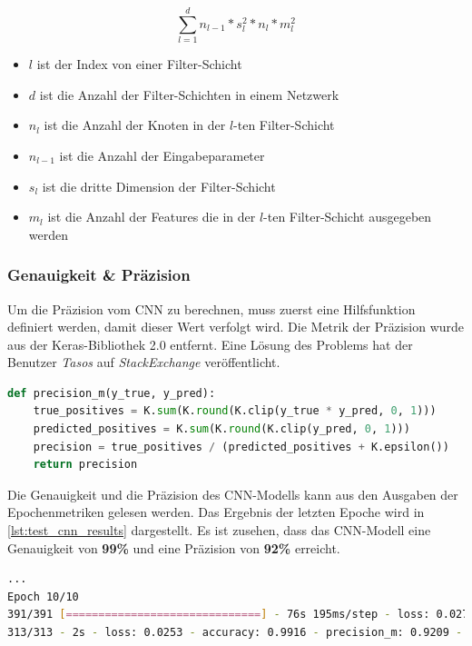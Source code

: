 \[\sum^{d}_{l=1}n_{l-1} * s^2_l * n_l * m^2_l \]

\begin{itemize}
	\item $l$ ist der Index von einer Filter-Schicht
	\item $d$ ist die Anzahl der Filter-Schichten in einem Netzwerk
	\item $n_l$ ist die Anzahl der Knoten in der $l$-ten Filter-Schicht
	\item $n_{l-1}$ ist die Anzahl der Eingabeparameter
	\item $s_l$ ist die dritte Dimension der Filter-Schicht
	\item $m_l$ ist die Anzahl der Features die in der $l$-ten Filter-Schicht ausgegeben werden
\end{itemize}
\cite{Kaiming_2014}

\subsubsection{Genauigkeit \& Präzision}

Um die Präzision vom CNN zu berechnen, muss zuerst eine Hilfsfunktion definiert werden, damit dieser Wert verfolgt wird. Die Metrik der Präzision wurde aus der Keras-Bibliothek 2.0 entfernt. Eine Lösung des Problems hat der Benutzer \textit{Tasos} auf \textit{StackExchange} veröffentlicht. \cite{stackexchange_2020}

\begin{minipage}{\textwidth}
	\begin{lstlisting}[language=Python, caption=Hilfsfunktion für Präzision \cite{stackexchange_2020}, label=lst:func_precision]
def precision_m(y_true, y_pred):
	true_positives = K.sum(K.round(K.clip(y_true * y_pred, 0, 1)))
	predicted_positives = K.sum(K.round(K.clip(y_pred, 0, 1)))
	precision = true_positives / (predicted_positives + K.epsilon())
	return precision	
	\end{lstlisting}
\end{minipage}


Die Genauigkeit und die Präzision des CNN-Modells kann aus den Ausgaben der Epochenmetriken gelesen werden. Das Ergebnis der letzten Epoche wird in \ref{lst:test_cnn_results} dargestellt. Es ist zusehen, dass das CNN-Modell eine Genauigkeit von \textbf{99\%} und eine Präzision von \textbf{92\%} erreicht. 

\begin{minipage}{\textwidth}
	\begin{lstlisting}[language=Bash, caption=Testergebnisse vom CNN, label=lst:test_cnn_results]
...
Epoch 10/10
391/391 [==============================] - 76s 195ms/step - loss: 0.0273 - accuracy: 0.9909 - precision_m: 0.9264 - val_loss: 0.0374 - val_accuracy: 0.9891 - val_precision_m: 0.9191
313/313 - 2s - loss: 0.0253 - accuracy: 0.9916 - precision_m: 0.9209 - 2s/epoch - 5ms/step
	\end{lstlisting}
\end{minipage}


